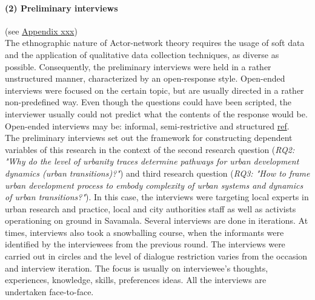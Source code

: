 \documentclass[11pt]{report}
\begin{document}
\paragraph{(2) Preliminary interviews} 
(see \href{ref}{Appendix xxx})
\\
The ethnographic nature of Actor-network theory requires the usage of soft data and the application of qualitative data collection techniques, as diverse as possible. Consequently, the preliminary interviews were held in a rather unstructured manner, characterized by an open-response style. Open-ended interviews were focused on the certain topic, but are usually directed in a rather non-predefined way. Even though the questions could have been scripted, the interviewer usually could not predict what the contents of the response would be. Open-ended interviews may be: informal, semi-restrictive and structured \href{ref}{ref}.
\\
The preliminary interviews set out the framework for constructing dependent variables of this research in the context of the second research question (\textit{RQ2: "Why do the level of urbanity traces determine pathways for urban development dynamics (urban transitions)?"}) and third research question (\textit{RQ3: "How to frame urban development process to embody complexity of urban systems and dynamics of urban transitions?"}). In this case, the interviews were targeting local experts in urban research and practice, local and city authorities staff as well as activists operationing on ground in Savamala. Several interviews are done in iterations. At times, interviews also took a snowballing course, when the informants were identified by the interviewees from the previous round. The interviews were carried out in circles and the level of dialogue restriction varies from the occasion and interview iteration. The focus is usually on interviewee's thoughts, experiences, knowledge, skills, preferences ideas. All the interviews are undertaken face-to-face.
\\
\end{document}

